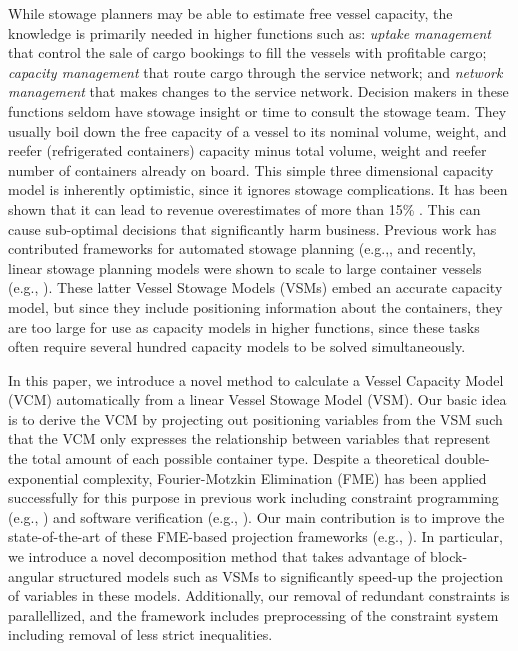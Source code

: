 \documentclass{llncs}
\begin{document}
While stowage planners may be able to estimate free vessel capacity, the knowledge is primarily needed in higher functions such as: {\em uptake management} that control the sale of cargo bookings to fill the vessels with profitable cargo; {\em capacity management} that route cargo through the service network; and {\em network management} that makes changes to the service network. Decision makers in these functions seldom have stowage insight or time to consult the stowage team. They usually boil down the free capacity of a vessel to its nominal volume, weight, and reefer (refrigerated containers) capacity minus total volume, weight and reefer number of containers already on board. This simple three dimensional capacity model is inherently optimistic, since it ignores stowage complications. It has been shown that it can lead to revenue overestimates of more than 15\% \cite{AlbertosThesis}. This can cause sub-optimal decisions that significantly harm business. Previous work has contributed frameworks for automated stowage planning (e.g.,\cite{roach00,kimkang02,ambrosino04,pacino11}, and recently, linear stowage planning models were shown to scale to large container vessels (e.g., \cite{AlbertosThesis}). These latter Vessel Stowage Models (VSMs) embed an accurate capacity model, but since they include positioning information about the containers, they are too large for use as capacity models in higher functions, since these tasks often require several hundred capacity models to be solved simultaneously.

In this paper, we introduce a novel method to calculate a Vessel Capacity Model (VCM) automatically from a linear Vessel Stowage Model (VSM). Our basic idea is to derive the VCM by projecting out positioning variables from the VSM such that the VCM only expresses the relationship between variables that represent the total amount of each possible container type. Despite a theoretical double-exponential complexity, Fourier-Motzkin Elimination (FME) has been applied successfully for this purpose in previous work including constraint programming (e.g., \cite{lassez90}) and software verification (e.g., \cite{benoy05}). Our main contribution is to improve the state-of-the-art of these FME-based projection frameworks (e.g., \cite{simon05,lukatskii08,shapot12}). In particular, we introduce a novel decomposition method that takes advantage of block-angular structured models such as VSMs to significantly speed-up the projection of variables in these models. Additionally, our removal of redundant constraints is parallellized, and the framework includes preprocessing of the constraint system including removal of less strict inequalities.
\end{document}
